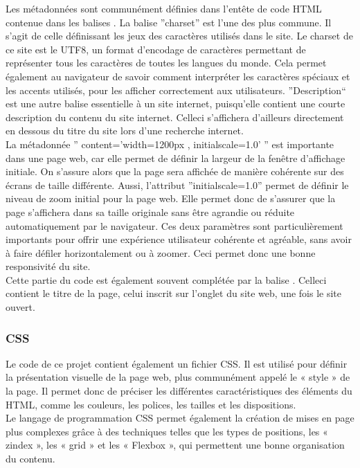 \documentclass[a4,10pt,french]{sphinxmanual}
\begin{document}
\sphinxAtStartPar
Les métadonnées sont communément définies dans l’entête de code HTML contenue dans les balises .
La balise ”charset” est l’une des plus commune. Il s’agit de celle définissant les jeux des caractères utilisés dans le site. Le charset de ce site est le UTF\sphinxhyphen{}8, un format d’encodage de caractères permettant de représenter tous les caractères de toutes les langues du monde. Cela permet également au navigateur de savoir comment interpréter les caractères spéciaux et les accents utilisés, pour les afficher correctement aux utilisateurs.
”Description“ est une autre balise essentielle à un site internet, puisqu’elle contient une courte description du contenu du site internet. Celle\sphinxhyphen{}ci s’affichera d’ailleurs directement en dessous du titre du site lors d’une recherche internet.\\
La métadonnée ” content=’width=1200px , initial\sphinxhyphen{}scale=1.0’ ” est importante dans une page web, car elle permet de définir la largeur de la fenêtre d’affichage initiale. On s’assure alors que la page sera affichée de manière cohérente sur des écrans de taille différente. Aussi, l’attribut ”initial\sphinxhyphen{}scale=1.0” permet de définir le niveau de zoom initial pour la page web. Elle permet donc de s’assurer que la page s’affichera dans sa taille originale sans être agrandie ou réduite automatiquement par le navigateur. Ces deux paramètres sont particulièrement importants pour offrir une expérience utilisateur cohérente et agréable, sans avoir à faire défiler horizontalement ou à zoomer. Ceci permet donc une bonne responsivité du site.\\
Cette partie du code est également souvent complétée par la balise . Celle\sphinxhyphen{}ci contient le titre de la page, celui inscrit sur l’onglet du site web, une fois le site ouvert.


\subsubsection{CSS}
\label{\detokenize{chapitre-02:css}}
\sphinxAtStartPar
Le code de ce projet contient également un fichier CSS. Il est utilisé pour définir la présentation visuelle de la page web, plus communément appelé le « style » de la page. Il permet donc de préciser les différentes caractéristiques des éléments du HTML, comme les couleurs, les polices, les tailles et les dispositions.\\
Le langage de programmation CSS permet également la création de mises en page plus complexes grâce à des techniques telles que les types de positions, les « z\sphinxhyphen{}index », les « grid » et les « Flex\sphinxhyphen{}box », qui permettent une bonne organisation du contenu.
\end{document}
